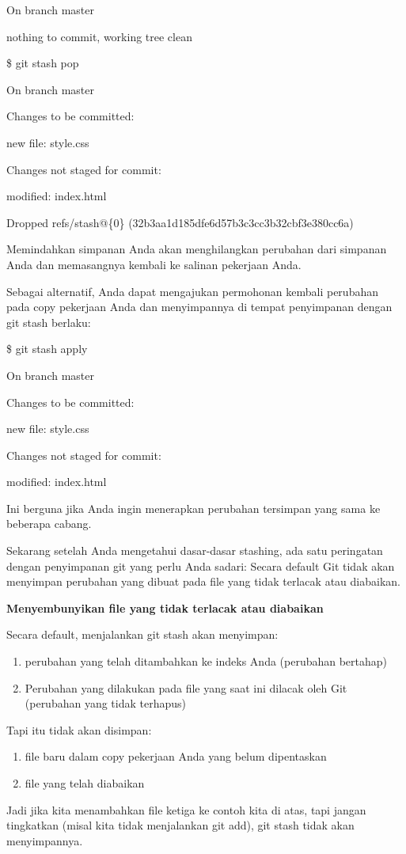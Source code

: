 \documentclass[12pt,a4paper]{article}
\begin{document}
On branch master

nothing to commit, working tree clean

\$ git stash pop

On branch master

Changes to be committed:

new file: style.css

Changes not staged for commit:

modified: index.html

Dropped refs/stash@\{0\} (32b3aa1d185dfe6d57b3c3cc3b32cbf3e380cc6a)

Memindahkan simpanan Anda akan menghilangkan perubahan dari simpanan 
Anda dan memasangnya kembali ke salinan pekerjaan Anda.



Sebagai alternatif, Anda dapat mengajukan permohonan kembali perubahan 
pada copy pekerjaan Anda dan menyimpannya di tempat penyimpanan dengan 
git stash berlaku:

\$ git stash apply

On branch master

Changes to be committed:

new file: style.css

Changes not staged for commit:

modified: index.html

Ini berguna jika Anda ingin menerapkan perubahan tersimpan yang sama ke 
beberapa cabang.

Sekarang setelah Anda mengetahui dasar-dasar stashing, ada satu 
peringatan dengan penyimpanan git yang perlu Anda sadari: Secara default 
Git tidak akan menyimpan perubahan yang dibuat pada file yang tidak 
terlacak atau diabaikan.

\textbf{Menyembunyikan file yang tidak terlacak atau diabaikan}

Secara default, menjalankan git stash akan menyimpan:

\begin{enumerate}
\item perubahan yang telah ditambahkan ke indeks Anda (perubahan 
bertahap)
\item Perubahan yang dilakukan pada file yang saat ini dilacak oleh Git 
(perubahan yang tidak terhapus)
\setcounter{numberedCntA}{\theenumi}
\end{enumerate}
Tapi itu tidak akan disimpan:

\begin{enumerate}
\item file baru dalam copy pekerjaan Anda yang belum dipentaskan
\item file yang telah diabaikan
\setcounter{numberedCntB}{\theenumi}
\end{enumerate}
Jadi jika kita menambahkan file ketiga ke contoh kita di atas, tapi 
jangan tingkatkan (misal kita tidak menjalankan git add), git stash 
tidak akan menyimpannya.\vspace{12pt} 
\end{document}
